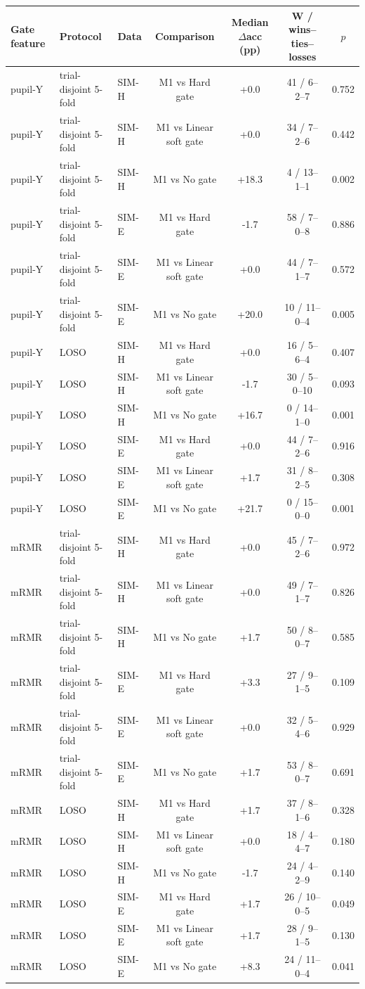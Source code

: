 \begin{tabular}{@{}lllcccc@{}}
\toprule
Gate feature & Protocol & Data & Comparison & Median $\Delta$acc (pp) & W / wins--ties--losses & $p$\\
\midrule
pupil-Y & trial-disjoint 5-fold & SIM-H & M1 vs Hard gate & +0.0 & 41 / 6--2--7 & 0.752\\
pupil-Y & trial-disjoint 5-fold & SIM-H & M1 vs Linear soft gate & +0.0 & 34 / 7--2--6 & 0.442\\
pupil-Y & trial-disjoint 5-fold & SIM-H & M1 vs No gate & +18.3 & 4 / 13--1--1 & 0.002\\
pupil-Y & trial-disjoint 5-fold & SIM-E & M1 vs Hard gate & -1.7 & 58 / 7--0--8 & 0.886\\
pupil-Y & trial-disjoint 5-fold & SIM-E & M1 vs Linear soft gate & +0.0 & 44 / 7--1--7 & 0.572\\
pupil-Y & trial-disjoint 5-fold & SIM-E & M1 vs No gate & +20.0 & 10 / 11--0--4 & 0.005\\
\midrule
pupil-Y & LOSO & SIM-H & M1 vs Hard gate & +0.0 & 16 / 5--6--4 & 0.407\\
pupil-Y & LOSO & SIM-H & M1 vs Linear soft gate & -1.7 & 30 / 5--0--10 & 0.093\\
pupil-Y & LOSO & SIM-H & M1 vs No gate & +16.7 & 0 / 14--1--0 & 0.001\\
pupil-Y & LOSO & SIM-E & M1 vs Hard gate & +0.0 & 44 / 7--2--6 & 0.916\\
pupil-Y & LOSO & SIM-E & M1 vs Linear soft gate & +1.7 & 31 / 8--2--5 & 0.308\\
pupil-Y & LOSO & SIM-E & M1 vs No gate & +21.7 & 0 / 15--0--0 & 0.001\\
\midrule
mRMR & trial-disjoint 5-fold & SIM-H & M1 vs Hard gate & +0.0 & 45 / 7--2--6 & 0.972\\
mRMR & trial-disjoint 5-fold & SIM-H & M1 vs Linear soft gate & +0.0 & 49 / 7--1--7 & 0.826\\
mRMR & trial-disjoint 5-fold & SIM-H & M1 vs No gate & +1.7 & 50 / 8--0--7 & 0.585\\
mRMR & trial-disjoint 5-fold & SIM-E & M1 vs Hard gate & +3.3 & 27 / 9--1--5 & 0.109\\
mRMR & trial-disjoint 5-fold & SIM-E & M1 vs Linear soft gate & +0.0 & 32 / 5--4--6 & 0.929\\
mRMR & trial-disjoint 5-fold & SIM-E & M1 vs No gate & +1.7 & 53 / 8--0--7 & 0.691\\
\midrule
mRMR & LOSO & SIM-H & M1 vs Hard gate & +1.7 & 37 / 8--1--6 & 0.328\\
mRMR & LOSO & SIM-H & M1 vs Linear soft gate & +0.0 & 18 / 4--4--7 & 0.180\\
mRMR & LOSO & SIM-H & M1 vs No gate & -1.7 & 24 / 4--2--9 & 0.140\\
mRMR & LOSO & SIM-E & M1 vs Hard gate & +1.7 & 26 / 10--0--5 & 0.049\\
mRMR & LOSO & SIM-E & M1 vs Linear soft gate & +1.7 & 28 / 9--1--5 & 0.130\\
mRMR & LOSO & SIM-E & M1 vs No gate & +8.3 & 24 / 11--0--4 & 0.041\\
\bottomrule
\end{tabular}
